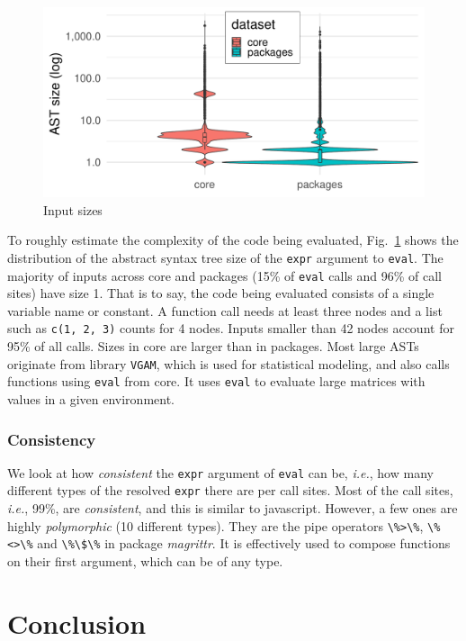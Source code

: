 \documentclass[USenglish,cleveref, autoref, thm-restate]{lipics-v2019}
\newcommand{\NbAstOnePercent}{15\%\xspace}
\newcommand{\NbAstOneCallSitePercent}{96\%\xspace}
\newcommand{\AstSizeNineFive}{42\xspace}
\newcommand{\PercentMonomorphic}{99\%\xspace}
\newcommand{\ie}{\emph{i.e.},\xspace}
\newcommand{\eval}{\texttt{eval}\xspace}
\renewcommand{\c}[1]{\lstinline{#1}\xspace}
\begin{document}
\begin{figure}[!b]
	\centering
  \includegraphics[width=\columnwidth]{ast_sizes}
  \caption{Input sizes} \label{fig:ast-size}
\end{figure}

To roughly estimate the complexity of the code being evaluated,
Fig.~\ref{fig:ast-size} shows the distribution of the abstract syntax tree
size of the \c{expr} argument to \eval. The majority of inputs across core
and packages (\NbAstOnePercent of \eval calls and \NbAstOneCallSitePercent
of call sites) have size 1. That is to say, the code being evaluated
consists of a single variable name or constant. A function call needs at
least three nodes and a list such as \c{c(1, 2, 3)} counts for 4
nodes. Inputs smaller than \AstSizeNineFive nodes account for 95\% of all
calls. Sizes in core are larger than in packages. Most large ASTs originate
from library \c{VGAM}, which is used for statistical modeling, and also calls functions using \eval from core. It uses
\eval to evaluate large matrices with values in a given environment.

\subsubsection{Consistency}

We look at how \emph{consistent} the \c{expr} argument of \eval can be, \ie
how many different types of the resolved \c{expr} there are per call
sites. Most of the call sites, \ie \PercentMonomorphic, are
\emph{consistent}, and this is similar to javascript. However, a few ones
are highly \emph{polymorphic} (10 different types). They are the pipe
operators \c{\%>\%}, \c{\%<>\%} and \c{\%\$\%} in package \emph{magrittr}. It
is effectively used to compose functions on their first argument, which can
be of any type.


\section{Conclusion}


\end{document}
